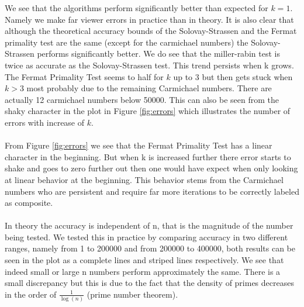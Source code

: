 \documentclass[compressed,final,notitlepage,narroweqnarray,inline,twoside,]{ieee}
\begin{document}
We see that the algorithms perform significantly better than expected for $k=1$. Namely we make far viewer errors in practice than in theory. It is also clear that although the theoretical accuracy bounds of the Solovay-Strassen and the Fermat primality test are the same (except for the carmichael numbers) the Solovay-Strassen performs significantly better. We do see that the miller-rabin test is twice as accurate as the Solovay-Strassen test. This trend persists when k grows. The Fermat Primality Test  seems to half for $k$ up to 3 but then gets stuck when $k>3$ most probably due to the remaining Carmichael numbers. There are actually 12 carmichael numbers below 50000. This can also be seen from the shaky character in the plot in Figure \ref{fig:errors} which illustrates the number of errors with increase of $k$.\\\\ From Figure \ref{fig:errors} we see that the Fermat Primality Test has a linear character in the beginning. But when k is increased further there error starts to shake and goes to zero further out then one would have expect when only looking at linear behavior at the beginning. This behavior stems from the Carmichael numbers who are persistent and require far more iterations to be correctly labeled as composite.\\\\ In theory the accuracy is independent of n, that is the magnitude of the number being tested. We tested this in practice by comparing accuracy in two different ranges, namely from 1 to 200000 and from 200000 to 400000, both results can be seen in the plot as a complete lines and striped lines respectively. We see that indeed small or large n numbers perform approximately the same. There is a small discrepancy but this is due to the fact that the density of primes decreases in the order of $\frac{1}{\log(n)}$ (prime number theorem).  
\end{document}
